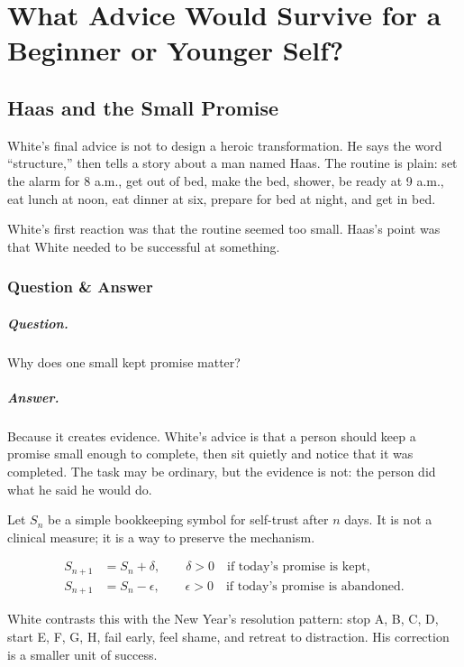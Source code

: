 \documentclass[11pt,oneside]{book}
\begin{document}
\chapter{What Advice Would Survive for a Beginner or Younger Self?}

\section{Haas and the Small Promise}

White's final advice is not to design a heroic transformation. He says the word ``structure,'' then tells a story about a man named Haas. The routine is plain: set the alarm for 8 a.m., get out of bed, make the bed, shower, be ready at 9 a.m., eat lunch at noon, eat dinner at six, prepare for bed at night, and get in bed.

White's first reaction was that the routine seemed too small. Haas's point was that White needed to be successful at something.

\subsection{Question \& Answer}

\paragraph{Question.}
Why does one small kept promise matter?

\paragraph{Answer.}
Because it creates evidence. White's advice is that a person should keep a promise small enough to complete, then sit quietly and notice that it was completed. The task may be ordinary, but the evidence is not: the person did what he said he would do.

Let \(S_n\) be a simple bookkeeping symbol for self-trust after \(n\) days. It is not a clinical measure; it is a way to preserve the mechanism.

\begin{align}
S_{n+1} &= S_n+\delta,
\qquad \delta>0
\quad \text{if today's promise is kept},\\
S_{n+1} &= S_n-\epsilon,
\qquad \epsilon>0
\quad \text{if today's promise is abandoned}.
\end{align}

White contrasts this with the New Year's resolution pattern: stop A, B, C, D, start E, F, G, H, fail early, feel shame, and retreat to distraction. His correction is a smaller unit of success.
\end{document}

